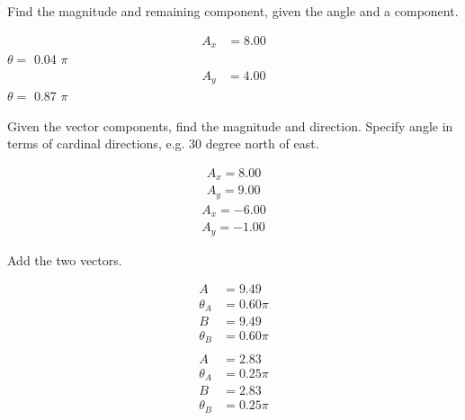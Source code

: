 \documentclass[letterpaper, 11pt]{article}
\begin{document}
 Find the magnitude and remaining component, given the angle and a component.  \\ 
\begin{multicols}{ 2 }
\begin{align}  
A_x &=  8.00 \nonumber  
\end{align}   
\hspace{3cm} $ \theta = $  0.04 $\pi$ 
\begin{align}  
A_y &=  4.00 \nonumber  
\end{align}   
\hspace{3cm} $ \theta = $  0.87 $\pi$ 
\end{multicols}

 Given the vector components, find the magnitude and direction. Specify angle in terms of cardinal directions, e.g. 30 degree north of east.  \\ 
\begin{multicols}{ 2 }
\begin{align}  
A_x =  8.00 \nonumber \\  
A_y =  9.00 \nonumber
\end{align}   
\begin{align}  
A_x = -6.00 \nonumber \\  
A_y = -1.00 \nonumber
\end{align}   
\end{multicols}

 Add the two vectors.  \\ 
\begin{multicols}{ 2 }
\begin{align}
A &=  9.49 \nonumber \\
\theta_A &=  0.60 \pi \nonumber \\
B &=  9.49 \nonumber \\
\theta_B &=  0.60 \pi \nonumber \\
\nonumber \end{align}\begin{align}
A &=  2.83 \nonumber \\
\theta_A &=  0.25 \pi \nonumber \\
B &=  2.83 \nonumber \\
\theta_B &=  0.25 \pi \nonumber \\
\nonumber \end{align}\end{multicols}
\end{document}
